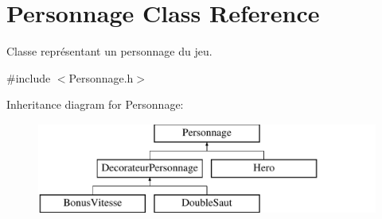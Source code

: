 \hypertarget{classPersonnage}{\section{Personnage Class Reference}
\label{classPersonnage}
}


Classe représentant un personnage du jeu.  




{\ttfamily \#include $<$Personnage.\-h$>$}

Inheritance diagram for Personnage\-:\begin{figure}[H]
\begin{center}
\leavevmode
\includegraphics[height=3.000000cm]{classPersonnage}
\end{center}
\end{figure}
